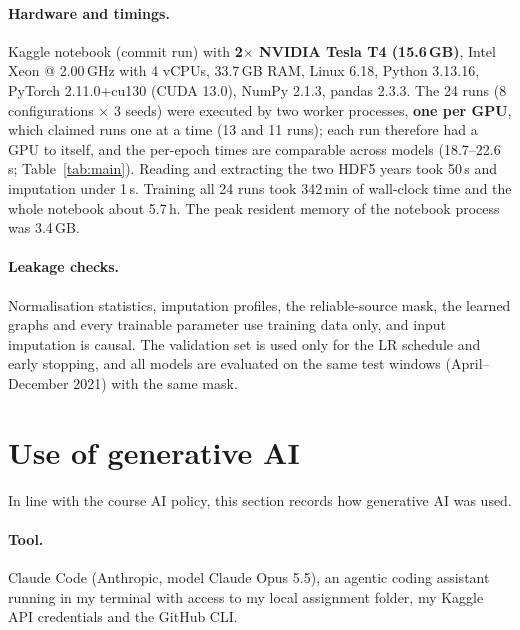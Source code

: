 \documentclass[11pt,a4paper]{article}
\begin{document}
\paragraph{Hardware and timings.} Kaggle notebook (commit run) with \textbf{2$\times$ NVIDIA Tesla T4 (15.6\,GB)}, Intel Xeon @
2.00\,GHz with 4 vCPUs, 33.7\,GB RAM, Linux 6.18, Python 3.13.16, PyTorch 2.11.0+cu130 (CUDA 13.0), NumPy 2.1.3, pandas 2.3.3.
The 24 runs (8 configurations $\times$ 3 seeds) were executed by two worker processes, \textbf{one per GPU}, which claimed runs
one at a time (13 and 11 runs); each run therefore had a GPU to itself, and the per-epoch times are comparable across models
(18.7--22.6\,s; Table~\ref{tab:main}). Reading and extracting the two HDF5 years took 50\,s and imputation under 1\,s. Training
all 24 runs took 342\,min of wall-clock time and the whole notebook about 5.7\,h. The peak resident memory of the notebook process
was 3.4\,GB.

\paragraph{Leakage checks.} Normalisation statistics, imputation profiles, the reliable-source mask, the learned graphs and every
trainable parameter use training data only, and input imputation is causal. The validation set is used only for the LR schedule and
early stopping, and all models are evaluated on the same test windows (April--December 2021) with the same mask.

\appendix
\section{Use of generative AI}
In line with the course AI policy, this section records how generative AI was used.

\paragraph{Tool.} Claude Code (Anthropic, model Claude Opus 5.5), an agentic coding assistant running in my terminal with
access to my local assignment folder, my Kaggle API credentials and the GitHub CLI.
\end{document}
